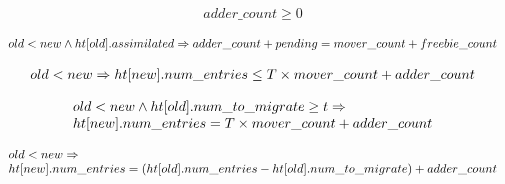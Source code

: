 \begin{lemma}
    \begin{equation*}
\begin{array}{l}      
  adder\_count \geq 0
\end{array}
    \end{equation*}  
    \label{posted0}  
\end{lemma}

\begin{lemma}
  \begin{equation*}
    \begin{array}{l}      
      old < new \wedge \mbox{$ht[old]$}.assimilated \Rightarrow adder\_count+ pending = mover\_count + freebie\_count
    \end{array}
  \end{equation*}    
  \label{posted1}
\end{lemma}

\begin{lemma}
  \begin{equation*}
    \begin{array}{l}      
      old < new \Rightarrow \mbox{$ht[new]$}.num\_entries \leq T \times mover\_count + adder\_count
    \end{array}
  \end{equation*}  
  \label{upper_strengthening1}
\end{lemma}

\begin{lemma}
\begin{equation*}
\begin{array}{l}  
  old < new \wedge \mbox{$ht[old]$}.num\_to\_migrate \geq t \Rightarrow
  \\ \mbox{$ht[new]$}.num\_entries = T \times mover\_count + adder\_count
\end{array}
\end{equation*}
\label{upper_strengthening2}  
\end{lemma}

\begin{lemma}
  \begin{equation*}
    \begin{array}{l}  
      old < new \Rightarrow \\
  \mbox{$ht[new]$}.num\_entries = (\mbox{$ht[old]$}.num\_entries - \mbox{$ht[old]$}.num\_to\_migrate) + adder\_count
\end{array}
\end{equation*}
  \label{upper_strengthening3}  
\end{lemma}

